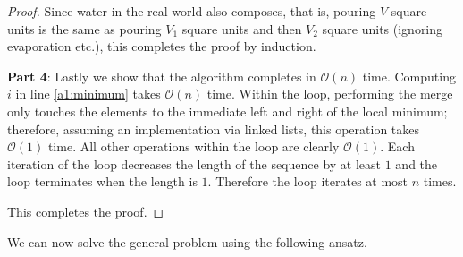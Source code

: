 \documentclass[11pt,a4paper]{article}
\newcommand{\bO}{\mathcal{O}}
\begin{document}
\begin{proof}
Since water in the real world also composes, that is, pouring $V$ square units is the same as pouring $V_1$ square units and then $V_2$ square units (ignoring evaporation etc.), this completes the proof by induction.

\textbf{Part 4}: Lastly we show that the algorithm completes in $\bO(n)$ time.
Computing $i$ in line \ref{a1:minimum} takes $\bO(n)$ time.
Within the loop, performing the merge only touches the elements to the immediate left and right of the local minimum; therefore, assuming an implementation via linked lists, this operation takes $\bO(1)$ time.
All other operations within the loop are clearly $\bO(1)$.
Each iteration of the loop decreases the length of the sequence by at least $1$ and the loop terminates when the length is $1$.
Therefore the loop iterates at most $n$ times.

This completes the proof.

\end{proof}

We can now solve the general problem using the following ansatz.
\end{document}
